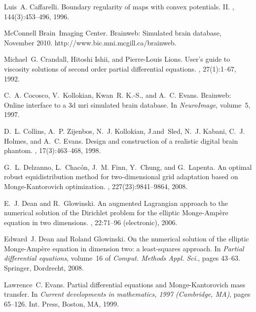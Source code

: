 \documentclass{amsart}
\theoremstyle{lemma}
\theoremstyle{remark}
\begin{document}
\begin{thebibliography}{CKKSE97}
Luis~A. Caffarelli.
\newblock Boundary regularity of maps with convex potentials. {II}.
, 144(3):453--496, 1996.

McConnell Brain~Imaging Center.
\newblock Brainweb: Simulated brain database, November 2010.
\newblock http://www.bic.mni.mcgill.ca/brainweb.

Michael~G. Crandall, Hitoshi Ishii, and Pierre-Louis Lions.
\newblock User's guide to viscosity solutions of second order partial
  differential equations.
, 27(1):1--67, 1992.

C.~A. Cocosco, V.~Kollokian, Kwan~R. K.-S., and A.~C. Evans.
\newblock Brainweb: Online interface to a 3d mri simulated brain database.
\newblock In {\em NeuroImage}, volume~5, 1997.

D.~L. Collins, A.~P. Zijenbos, N.~J. Kollokian, J.and~Sled, N.~J. Kabani, C.~J.
  Holmes, and A.~C. Evans.
\newblock Design and construction of a realistic digital brain phantom.
, 17(3):463--468, 1998.

G.~L. Delzanno, L.~Chac{\'o}n, J.~M. Finn, Y.~Chung, and G.~Lapenta.
\newblock An optimal robust equidistribution method for two-dimensional grid
  adaptation based on {M}onge-{K}antorovich optimization.
, 227(23):9841--9864, 2008.

E.~J. Dean and R.~Glowinski.
\newblock An augmented {L}agrangian approach to the numerical solution of the
  {D}irichlet problem for the elliptic {M}onge-{A}mp\`ere equation in two
  dimensions.
, 22:71--96 (electronic), 2006.

Edward~J. Dean and Roland Glowinski.
\newblock On the numerical solution of the elliptic {M}onge-{A}mp\`ere equation
  in dimension two: a least-squares approach.
\newblock In {\em Partial differential equations}, volume~16 of {\em Comput.
  Methods Appl. Sci.}, pages 43--63. Springer, Dordrecht, 2008.

Lawrence~C. Evans.
\newblock Partial differential equations and {M}onge-{K}antorovich mass
  transfer.
\newblock In {\em Current developments in mathematics, 1997 (Cambridge, MA)},
  pages 65--126. Int. Press, Boston, MA, 1999.


\end{thebibliography}
\end{document}
